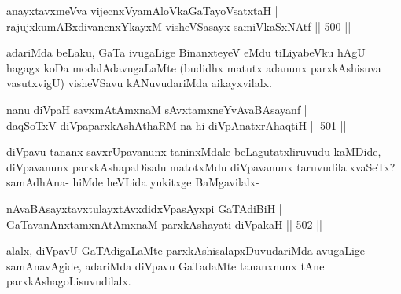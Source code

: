 
\begin{shl}
anayxtavxmeVva vijecnxVyamAloVkaGaTayoV\footnotemark[1]satxtaH | \\
\footnotemark[3]rajujxkumABxdivanenxYkayxM \footnotemark[2]visheVSasayx samiVkaSxNAtf \hfill||  500 ||  
\end{shl}
\footnotetext[1]{}

\begin{artha}
adariMda beLaku, GaTa ivugaLige BinanxteyeV eMdu tiLiyabeVku hAgU hagagx koDa modalAdavugaLaMte (budidhx matutx adanunx parxkAshisuva vasutxvigU) visheVSavu kANuvudariMda aikayxvilalx.
\end{artha}


\begin{shl}
nanu diVpaH savxmAtAmxnaM sAvxtamxneYvAvaBAsayanf | \\
daqSoTxV diVpaparxkAshAthaRM na hi diVpAnatxrAhaqtiH \hfill||  501 ||  
\end{shl}

\begin{artha}
diVpavu tananx savxrUpavanunx taninxMdale beLagutatxliruvudu kaMDide, diVpavanunx parxkAshapaDisalu matotxMdu diVpavanunx taruvudilalxvaSeTx? samAdhAna- hiMde heVLida yukitxge BaMgavilalx-
\end{artha}

\begin{shl}
nAvaBAsayxtavxtulayxtAvxdidxVpasAyxpi GaTAdiBiH | \\
GaTavanAnx\s \s tamxnA\s \s tAmxnaM parxkAshayati diVpakaH \hfill||  502 ||  
\end{shl}

\begin{artha}
alalx, diVpavU GaTAdigaLaMte parxkAshisalapxDuvudariMda avugaLige samAnavAgide, adariMda diVpavu GaTadaMte tananxnunx tAne parxkAshagoLisuvudilalx.
\end{artha}

